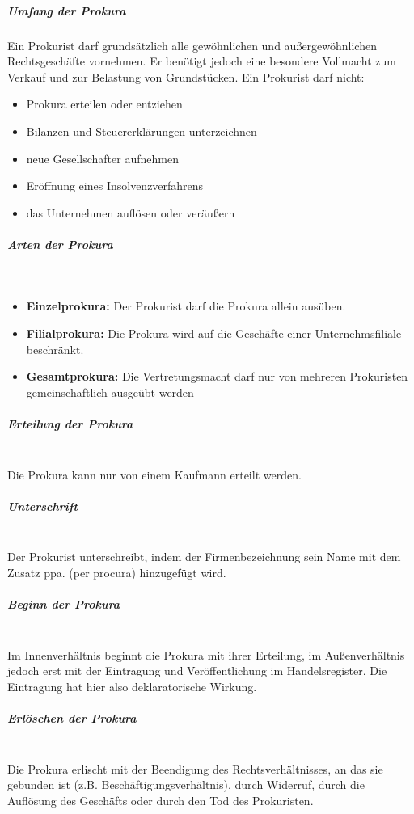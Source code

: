\subparagraph{Umfang der Prokura} Ein Prokurist darf grundsätzlich alle gewöhnlichen und außergewöhnlichen Rechtsgeschäfte vornehmen. Er benötigt jedoch eine besondere Vollmacht zum Verkauf und zur Belastung von Grundstücken. Ein Prokurist darf nicht:
\begin{itemize}
	\item Prokura erteilen oder entziehen
	\item Bilanzen und Steuererklärungen unterzeichnen
	\item neue Gesellschafter aufnehmen
	\item Eröffnung eines Insolvenzverfahrens
	\item das Unternehmen auflösen oder veräußern
\end{itemize}
	
\subparagraph{Arten der Prokura}~\\
\begin{itemize}
	\item {\bf Einzelprokura:} Der Prokurist darf die Prokura allein ausüben.
	\item {\bf Filialprokura:} Die Prokura wird auf die Geschäfte einer Unternehmsfiliale beschränkt.
	\item {\bf Gesamtprokura:} Die Vertretungsmacht darf nur von mehreren Prokuristen gemeinschaftlich ausgeübt werden
\end{itemize}
	
\subparagraph{Erteilung der Prokura}~\\
Die Prokura kann nur von einem Kaufmann erteilt werden.
	
\subparagraph{Unterschrift}~\\
Der Prokurist unterschreibt, indem der Firmenbezeichnung sein Name mit dem Zusatz ppa. (per procura) hinzugefügt wird.
	
\subparagraph{Beginn der Prokura}~\\
Im Innenverhältnis beginnt die Prokura mit ihrer Erteilung, im Außenverhältnis jedoch erst mit der Eintragung und Veröffentlichung im Handelsregister. Die Eintragung hat hier also deklaratorische Wirkung.
	
\subparagraph{Erlöschen der Prokura}~\\
Die Prokura erlischt mit der Beendigung des Rechtsverhältnisses, an das sie gebunden ist (z.B. Beschäftigungsverhältnis), durch Widerruf, durch die Auflösung des Geschäfts oder durch den Tod des Prokuristen.
	
